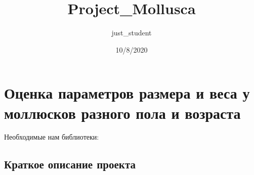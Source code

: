 \documentclass[]{article}
\title{Project\_Mollusca}
\author{just\_student}
\date{10/8/2020}
\newenvironment{Shaded}{\begin{snugshade}}{\end{snugshade}}
\newcommand{\ControlFlowTok}[1]{\textcolor[rgb]{0.13,0.29,0.53}{\textbf{#1}}}
\newcommand{\DataTypeTok}[1]{\textcolor[rgb]{0.13,0.29,0.53}{#1}}
\newcommand{\KeywordTok}[1]{\textcolor[rgb]{0.13,0.29,0.53}{\textbf{#1}}}
\newcommand{\NormalTok}[1]{#1}
\newcommand{\OperatorTok}[1]{\textcolor[rgb]{0.81,0.36,0.00}{\textbf{#1}}}
\newcommand{\StringTok}[1]{\textcolor[rgb]{0.31,0.60,0.02}{#1}}
\begin{document}
\maketitle

\hypertarget{ux43eux446ux435ux43dux43aux430-ux43fux430ux440ux430ux43cux435ux442ux440ux43eux432-ux440ux430ux437ux43cux435ux440ux430-ux438-ux432ux435ux441ux430-ux443-ux43cux43eux43bux43bux44eux441ux43aux43eux432-ux440ux430ux437ux43dux43eux433ux43e-ux43fux43eux43bux430-ux438-ux432ux43eux437ux440ux430ux441ux442ux430}{%
\section{Оценка параметров размера и веса у моллюсков разного пола и
возраста}\label{ux43eux446ux435ux43dux43aux430-ux43fux430ux440ux430ux43cux435ux442ux440ux43eux432-ux440ux430ux437ux43cux435ux440ux430-ux438-ux432ux435ux441ux430-ux443-ux43cux43eux43bux43bux44eux441ux43aux43eux432-ux440ux430ux437ux43dux43eux433ux43e-ux43fux43eux43bux430-ux438-ux432ux43eux437ux440ux430ux441ux442ux430}}

Необходимые нам библиотеки:

\begin{Shaded}
\end{Shaded}

\hypertarget{ux43aux440ux430ux442ux43aux43eux435-ux43eux43fux438ux441ux430ux43dux438ux435-ux43fux440ux43eux435ux43aux442ux430}{%
\subsection{Краткое описание
проекта}\label{ux43aux440ux430ux442ux43aux43eux435-ux43eux43fux438ux441ux430ux43dux438ux435-ux43fux440ux43eux435ux43aux442ux430}}
\end{document}
